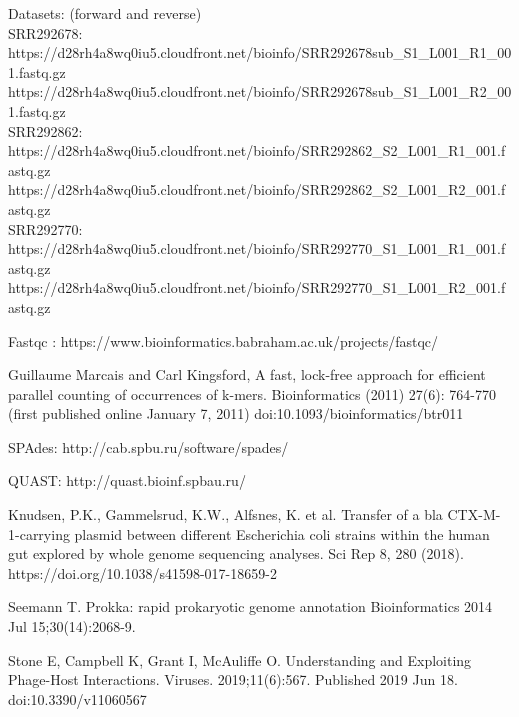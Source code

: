 \documentclass{article}
\begin{document}
\begin{thebibliography}{9}
 Datasets:  (forward and reverse) \\
SRR292678: \\
https://d28rh4a8wq0iu5.cloudfront.net/bioinfo/SRR292678sub\_S1\_L001\_R1\_001.fastq.gz \\ https://d28rh4a8wq0iu5.cloudfront.net/bioinfo/SRR292678sub\_S1\_L001\_R2\_001.fastq.gz \\
SRR292862: \\
https://d28rh4a8wq0iu5.cloudfront.net/bioinfo/SRR292862\_S2\_L001\_R1\_001.fastq.gz \\ https://d28rh4a8wq0iu5.cloudfront.net/bioinfo/SRR292862\_S2\_L001\_R2\_001.fastq.gz \\
SRR292770: \\
https://d28rh4a8wq0iu5.cloudfront.net/bioinfo/SRR292770\_S1\_L001\_R1\_001.fastq.gz \\
https://d28rh4a8wq0iu5.cloudfront.net/bioinfo/SRR292770\_S1\_L001\_R2\_001.fastq.gz

 Fastqc : https://www.bioinformatics.babraham.ac.uk/projects/fastqc/
 
 
 Guillaume Marcais and Carl Kingsford, A fast, lock-free approach for efficient parallel counting of occurrences of k-mers. Bioinformatics (2011) 27(6): 764-770 (first published online January 7, 2011) doi:10.1093/bioinformatics/btr011
 
 
SPAdes: http://cab.spbu.ru/software/spades/


QUAST: http://quast.bioinf.spbau.ru/

Knudsen, P.K., Gammelsrud, K.W., Alfsnes, K. et al. Transfer of a bla CTX-M-1-carrying plasmid between different Escherichia coli strains within the human gut explored by whole genome sequencing analyses. Sci Rep 8, 280 (2018). https://doi.org/10.1038/s41598-017-18659-2

Seemann T.
Prokka: rapid prokaryotic genome annotation
Bioinformatics 2014 Jul 15;30(14):2068-9.


Stone E, Campbell K, Grant I, McAuliffe O. Understanding and Exploiting Phage-Host Interactions. Viruses. 2019;11(6):567. Published 2019 Jun 18. doi:10.3390/v11060567

\end{thebibliography}
\end{document}
